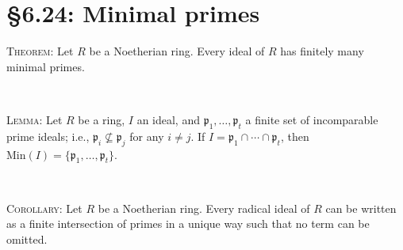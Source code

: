 \documentclass[12pt]{amsart}
\newcommand{\p}{\mathfrak{p}}
\newcommand{\Min}{\mathrm{Min}}
\renewcommand{\1}{\mathbbm{1}}
\newcommand{\showsol}[1]{\def\displaysol{#1}}
\begin{document}
\showsol{0}
	
	\thispagestyle{empty}
	
	\section*{\S6.24: Minimal primes}
	
	\begin{framed}

\noindent \textsc{Theorem:} Let $R$ be a Noetherian ring. Every ideal of $R$ has finitely many minimal primes.

\

\noindent \textsc{Lemma:} Let $R$ be a ring, $I$ an ideal, and $\p_1,\dots,\p_t$ a finite set of incomparable prime ideals; i.e., $\p_i \not\subseteq \p_j$ for any $i\neq j$. If $I = \p_1 \cap \cdots \cap \p_t$, then $\Min(I) = \{\p_1,\dots,\p_t \}$.

\

\noindent \textsc{Corollary:} Let $R$ be a Noetherian ring. Every radical ideal of $R$ can be written as a finite intersection of primes in a unique way such that no term can be omitted.

\end{framed}


	
\end{document}
